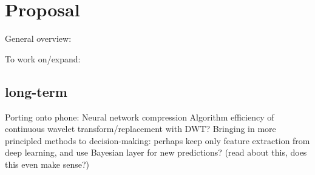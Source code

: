 \documentclass[12pt]{llncs}
\begin{document}
\begin{comment}
However, to the best of our knowledge, the more flexible wavelet transform is hardly ever used as the representation domain for a convolutional neural network. As a result, in the following section we present our methodology, which leverages the benefits of the wavelet transform demonstrated in the signal processing literature, as well as the ability to form hierarchical feature representations for deep learning.





\end{comment}








\section{Proposal}
General overview:

To work on/expand:
\subsection{long-term} Porting onto phone:
Neural network compression
Algorithm efficiency of continuous wavelet transform/replacement with DWT?
Bringing in more principled methods to decision-making: perhaps keep only feature extraction from deep learning, and use Bayesian layer for new predictions? (read about this, does this even make sense?)
\end{document}

